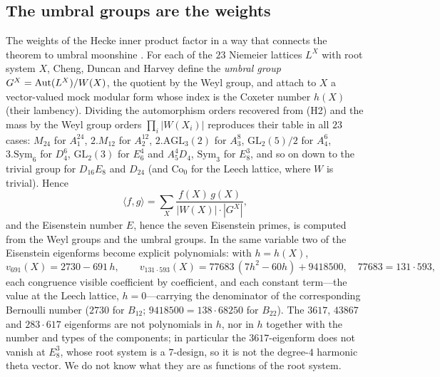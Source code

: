 \documentclass[11pt]{amsart}
\theoremstyle{definition}
\begin{document}
\subsection{The umbral groups are the weights} The weights of the Hecke inner product factor in a way that connects the theorem to umbral moonshine \cite{CDH}. For each of the $23$ Niemeier lattices $L^X$ with root system $X$, Cheng, Duncan and Harvey define the \emph{umbral group} $G^X=\operatorname{Aut}(L^X)/W(X)$, the quotient by the Weyl group, and attach to $X$ a vector-valued mock modular form whose index is the Coxeter number $h(X)$ (their lambency). Dividing the automorphism orders recovered from (H2) and the mass by the Weyl group orders $\prod_i|W(X_i)|$ reproduces their table in all $23$ cases: $M_{24}$ for $A_1^{24}$, $2.M_{12}$ for $A_2^{12}$, $2.\mathrm{AGL}_3(2)$ for $A_3^8$, $\mathrm{GL}_2(5)/2$ for $A_4^6$, $3.\mathrm{Sym}_6$ for $D_4^6$, $\mathrm{GL}_2(3)$ for $E_6^4$ and $A_5^4D_4$, $\mathrm{Sym}_3$ for $E_8^3$, and so on down to the trivial group for $D_{16}E_8$ and $D_{24}$ (and $\mathrm{Co}_0$ for the Leech lattice, where $W$ is trivial). Hence
\[\langle f,g\rangle=\sum_X\frac{f(X)\,g(X)}{|W(X)|\cdot|G^X|},\]
and the Eisenstein number $E$, hence the seven Eisenstein primes, is computed from the Weyl groups and the umbral groups. In the same variable two of the Eisenstein eigenforms become explicit polynomials: with $h=h(X)$,
\[v_{691}(X)=2730-691\,h,\qquad v_{131\cdot593}(X)=77683\,(7h^2-60h)+9418500,\quad 77683=131\cdot593,\]
each congruence visible coefficient by coefficient, and each constant term---the value at the Leech lattice, $h=0$---carrying the denominator of the corresponding Bernoulli number ($2730$ for $B_{12}$; $9418500=138\cdot68250$ for $B_{22}$). The $3617$, $43867$ and $283\cdot617$ eigenforms are not polynomials in $h$, nor in $h$ together with the number and types of the components; in particular the $3617$-eigenform does not vanish at $E_8^3$, whose root system is a $7$-design, so it is not the degree-$4$ harmonic theta vector. We do not know what they are as functions of the root system.
\end{document}
